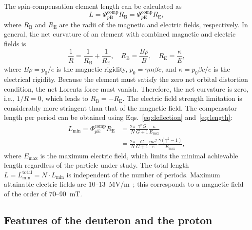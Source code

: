 \documentclass[%
  aps,
  pra,
  preprint,
  a4paper,
  amsmath,
  amssymb,
  floatfix,
  longbibliography,
  superscriptaddress
]{revtex4-2}
\begin{document}
The spin-compensation element length can be calculated as
\begin{equation}
  L = \Phi_{p\mathrm{B}}^{\mathrm{comp}}R_{\mathrm{B}}
    = \Phi_{p\mathrm{E}}^{\mathrm{comp}}R_{\mathrm{E}},
  \label{eq:length}
\end{equation}
where $R_{\mathrm{B}}$ and $R_{\mathrm{E}}$ are the radii of the magnetic and
electric fields, respectively. In general, the net curvature of an element
with combined magnetic and electric fields is
\begin{equation}
  \frac{1}{R} = \frac{1}{R_{\mathrm{B}}}+\frac{1}{R_{\mathrm{E}}}, \quad
  R_{\mathrm{B}}=\frac{B\rho}{B}, \quad
  R_{\mathrm{E}}=\frac{\kappa}{E},
  \label{eq:total_radius}
\end{equation}
where $B\rho = p_{0}/e$ is the magnetic rigidity, $p_{0} = \gamma m\beta c$,
and $\kappa = p_{0}\beta c/e$ is the electrical rigidity. Because the element
must satisfy the zero net orbital distortion condition, the net Lorentz force
must vanish. Therefore, the net curvature is zero, i.e., $1/R = 0$, which
leads to $R_{\mathrm{B}} = -R_{\mathrm{E}}$. The electric field strength
limitation is considerably more stringent than that of the magnetic field.
The compensator length per period can be obtained using
Eqs.~\eqref{eq:deflection} and~\eqref{eq:length}:
\begin{equation}
\begin{aligned}
  L_{\mathrm{min}} = \Phi_{p\mathrm{E}}^{\mathrm{comp}}R_{\mathrm{E}}
  &= \frac{2\pi}{N}\frac{\gamma^2 G}{G+1}\frac{\kappa}{E_{\mathrm{max}}} \\
  &= \frac{2\pi}{N}\frac{G}{G+1}\frac{mc^2}{e}
     \frac{\gamma(\gamma^2-1)}{E_{\mathrm{max}}},
\end{aligned}
\label{eq:length_min}
\end{equation}
where $E_{\mathrm{max}}$ is the maximum electric field, which limits the
minimal achievable length regardless of the particle under study. The total
length $L=L_{\mathrm{min}}^{\mathrm{total}} = N\cdot L_{\mathrm{min}}$ is
independent of the number of periods. Maximum attainable electric fields are
10--\SI{13}{MV/m}~\cite{Kolokolchikov:2026xbv}; this corresponds to a magnetic
field of the order of 70--\SI{90}{mT}.

\subsection{Features of the deuteron and the proton}
\label{sec:qfs-particles}
\end{document}
